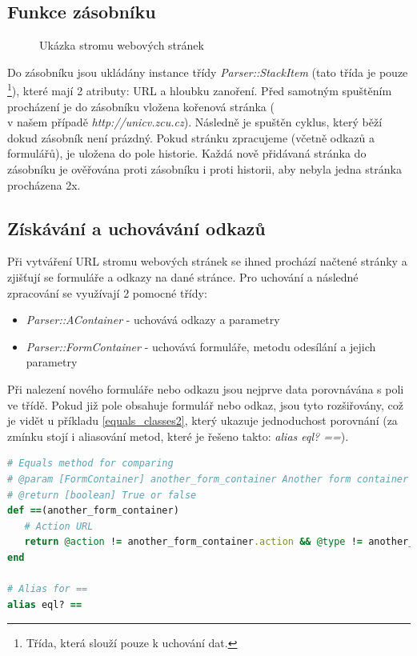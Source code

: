 \documentclass[12pt, a4paper]{report}
\begin{document}
\subsection{Funkce zásobníku}
\begin{figure}[h!]
\caption{Ukázka stromu webových stránek}
\label{obr.url_tree}
\end{figure}
Do zásobníku jsou ukládány instance třídy \textit{Parser::StackItem} (tato třída je pouze \footnote{Třída, která slouží pouze k uchování dat.}), které mají 2 atributy: URL a hloubku zanoření. Před samotným spuštěním procházení je do zásobníku vložena kořenová stránka (\\v našem případě \textit{http://unicv.zcu.cz}). Následně je spuštěn cyklus, který běží dokud zásobník není prázdný. Pokud stránku zpracujeme (včetně odkazů a formulářů), je uložena do pole historie. Každá nově přidávaná stránka do zásobníku je ověřována proti zásobníku i proti historii, aby nebyla jedna stránka procházena 2x.

\subsection{Získávání a uchovávání odkazů}
Při vytváření URL stromu webových stránek se ihned prochází načtené stránky a zjišťují se formuláře a odkazy na dané stránce. Pro uchování a následné zpracování se využívají 2 pomocné třídy:
\begin{itemize}
\item \textit{Parser::AContainer} - uchovává odkazy a parametry
\item \textit{Parser::FormContainer} - uchovává formuláře, metodu odesílání a jejich parametry
\end{itemize}
Při nalezení nového formuláře nebo odkazu jsou nejprve data porovnávána s poli ve třídě. Pokud již pole obsahuje formulář nebo odkaz, jsou tyto rozšiřovány, což je vidět u příkladu \ref{equals_classes2}, který ukazuje jednoduchost porovnání (za zmínku stojí i aliasování metod, které je řešeno takto: \textit{alias eql? ==}).

\begin{lstlisting}[label=equals_classes2,language=Ruby, caption=Porovnání dvou instancí třídy FormContainer]
# Equals method for comparing
# @param [FormContainer] another_form_container Another form container
# @return [boolean] True or false
def ==(another_form_container)
   # Action URL
   return @action != another_form_container.action && @type != another_form_container.type &&  @params != another_form_container.params
end

# Alias for ==
alias eql? ==
\end{lstlisting}
\end{document}
